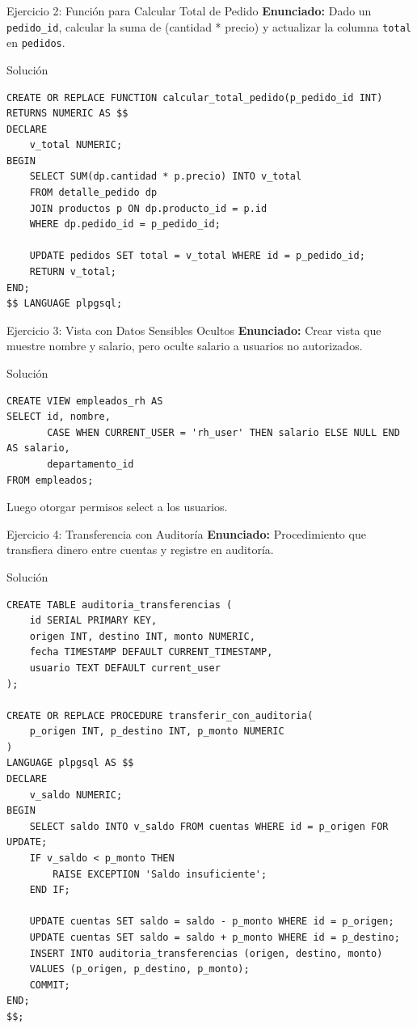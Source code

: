 \documentclass[aspectratio=169, 10pt, xcolor=table]{beamer}
\begin{document}
\begin{frame}[fragile]{Ejercicio 2: Función para Calcular Total de Pedido}
    \textbf{Enunciado:} Dado un \texttt{pedido\_id}, calcular la suma de (cantidad * precio) y actualizar la columna \texttt{total} en \texttt{pedidos}.
    \begin{block}{Solución}
        \begin{lstlisting}
CREATE OR REPLACE FUNCTION calcular_total_pedido(p_pedido_id INT)
RETURNS NUMERIC AS $$
DECLARE
    v_total NUMERIC;
BEGIN
    SELECT SUM(dp.cantidad * p.precio) INTO v_total
    FROM detalle_pedido dp
    JOIN productos p ON dp.producto_id = p.id
    WHERE dp.pedido_id = p_pedido_id;

    UPDATE pedidos SET total = v_total WHERE id = p_pedido_id;
    RETURN v_total;
END;
$$ LANGUAGE plpgsql;
        \end{lstlisting}
    \end{block}
\end{frame}

\begin{frame}[fragile]{Ejercicio 3: Vista con Datos Sensibles Ocultos}
    \textbf{Enunciado:} Crear vista que muestre nombre y salario, pero oculte salario a usuarios no autorizados.
    \begin{block}{Solución}
        \begin{lstlisting}
CREATE VIEW empleados_rh AS
SELECT id, nombre,
       CASE WHEN CURRENT_USER = 'rh_user' THEN salario ELSE NULL END AS salario,
       departamento_id
FROM empleados;
        \end{lstlisting}
    \end{block}
    Luego otorgar permisos select a los usuarios.
\end{frame}

\begin{frame}[fragile]{Ejercicio 4: Transferencia con Auditoría}
    \textbf{Enunciado:} Procedimiento que transfiera dinero entre cuentas y registre en auditoría.
    \begin{block}{Solución}
        \begin{lstlisting}
CREATE TABLE auditoria_transferencias (
    id SERIAL PRIMARY KEY,
    origen INT, destino INT, monto NUMERIC,
    fecha TIMESTAMP DEFAULT CURRENT_TIMESTAMP,
    usuario TEXT DEFAULT current_user
);

CREATE OR REPLACE PROCEDURE transferir_con_auditoria(
    p_origen INT, p_destino INT, p_monto NUMERIC
)
LANGUAGE plpgsql AS $$
DECLARE
    v_saldo NUMERIC;
BEGIN
    SELECT saldo INTO v_saldo FROM cuentas WHERE id = p_origen FOR UPDATE;
    IF v_saldo < p_monto THEN
        RAISE EXCEPTION 'Saldo insuficiente';
    END IF;

    UPDATE cuentas SET saldo = saldo - p_monto WHERE id = p_origen;
    UPDATE cuentas SET saldo = saldo + p_monto WHERE id = p_destino;
    INSERT INTO auditoria_transferencias (origen, destino, monto)
    VALUES (p_origen, p_destino, p_monto);
    COMMIT;
END;
$$;
        \end{lstlisting}
    \end{block}
\end{frame}
\end{document}
